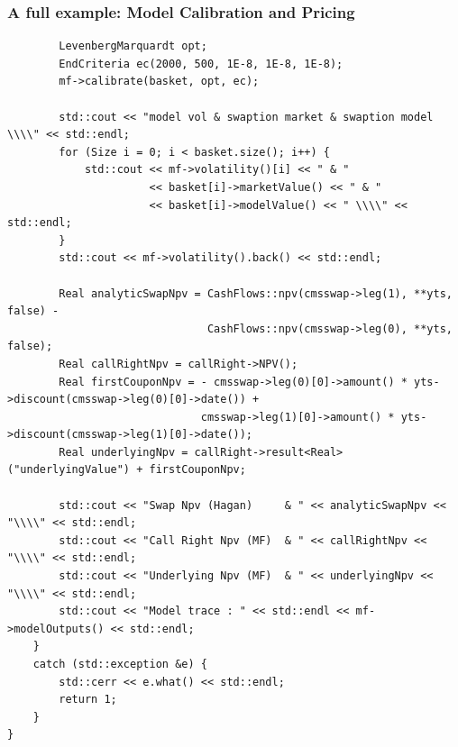 \documentclass{beamer}
\begin{document}
\begin{frame}[fragile]
\frametitle{A full example: Model Calibration and Pricing}
\begin{verbatim}
        LevenbergMarquardt opt;
        EndCriteria ec(2000, 500, 1E-8, 1E-8, 1E-8);
        mf->calibrate(basket, opt, ec);

        std::cout << "model vol & swaption market & swaption model \\\\" << std::endl;
        for (Size i = 0; i < basket.size(); i++) {
            std::cout << mf->volatility()[i] << " & "
                      << basket[i]->marketValue() << " & "
                      << basket[i]->modelValue() << " \\\\" << std::endl;
        }
        std::cout << mf->volatility().back() << std::endl;

        Real analyticSwapNpv = CashFlows::npv(cmsswap->leg(1), **yts, false) -
                               CashFlows::npv(cmsswap->leg(0), **yts, false);
        Real callRightNpv = callRight->NPV();
        Real firstCouponNpv = - cmsswap->leg(0)[0]->amount() * yts->discount(cmsswap->leg(0)[0]->date()) +
                              cmsswap->leg(1)[0]->amount() * yts->discount(cmsswap->leg(1)[0]->date());
        Real underlyingNpv = callRight->result<Real>("underlyingValue") + firstCouponNpv;

        std::cout << "Swap Npv (Hagan)     & " << analyticSwapNpv << "\\\\" << std::endl;
        std::cout << "Call Right Npv (MF)  & " << callRightNpv << "\\\\" << std::endl;
        std::cout << "Underlying Npv (MF)  & " << underlyingNpv << "\\\\" << std::endl;
        std::cout << "Model trace : " << std::endl << mf->modelOutputs() << std::endl;
    }
    catch (std::exception &e) {
        std::cerr << e.what() << std::endl;
        return 1;
    }
}
\end{verbatim}
\end{frame}
\end{document}
